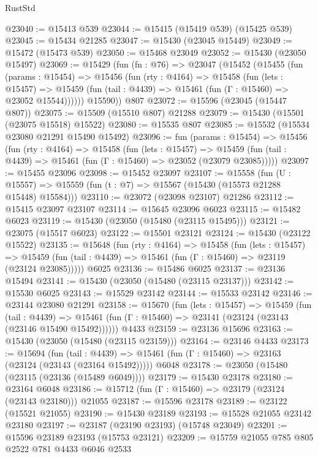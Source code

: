 \begin{lexlean}{RustStd}
\begin{coremodule}
@23040 := @15413 @539
@23044 := @15415 (@15419 @539) (@15425 @539)
@23045 := @15434 @21285
@23047 := @15430 (@23045 @15449)
@23049 := @15472 (@15473 @539)
@23050 := @15468 @23049
@23052 := @15430 (@23050 @15497)
@23069 := @15429
    (fun (fn : @76) =>
    @23047
      (@15452
        (@15455
          (fun (params : @15454) =>
          @15456
            (fun (rty : @4164) =>
            @15458
              (fun (lets : @15457) =>
              @15459 (fun (tail : @4439) => @15461 (fun (Γ : @15460) => @23052 @15544))))))
        @15590))
    @807
@23072 := @15596 (@23045 (@15447 @807))
@23075 := @15509 (@15510 @807) @21288
@23079 := @15430 (@15501 (@23075 @15518) @15522)
@23080 := @15535 @807
@23085 := @15532 (@15534 @23080 @21291 @15490 @15492)
@23096 := fun (params : @15454) =>
  @15456
    (fun (rty : @4164) =>
    @15458
      (fun (lets : @15457) =>
      @15459 (fun (tail : @4439) => @15461 (fun (Γ : @15460) => @23052 (@23079 @23085)))))
@23097 := @15455 @23096
@23098 := @15452 @23097
@23107 := @15558
    (fun (U : @15557) => @15559 (fun (t : @7) => @15567 (@15430 (@15573 @21288 @15448) @15584)))
@23110 := @23072 (@23098 @23107) @21286
@23112 := @15415 @23097 @23107
@23114 := @15645 @23096 @6023
@23115 := @15482 @6023
@23119 := @15430 (@23050 (@15480 (@23115 @15495)))
@23121 := @23075 (@15517 @6023)
@23122 := @15501 @23121
@23124 := @15430 (@23122 @15522)
@23135 := @15648
    (fun (rty : @4164) =>
    @15458
      (fun (lets : @15457) =>
      @15459 (fun (tail : @4439) => @15461 (fun (Γ : @15460) => @23119 (@23124 @23085)))))
    @6025
@23136 := @15486 @6025
@23137 := @23136 @15494
@23141 := @15430 (@23050 (@15480 (@23115 @23137)))
@23142 := @15530 @6025
@23143 := @15529 @23142
@23144 := @15533 @23142
@23146 := @23144 @23080 @21291
@23158 := @15670
    (fun (lets : @15457) =>
    @15459
      (fun (tail : @4439) =>
      @15461 (fun (Γ : @15460) => @23141 (@23124 (@23143 (@23146 @15490 @15492))))))
    @4433
@23159 := @23136 @15696
@23163 := @15430 (@23050 (@15480 (@23115 @23159)))
@23164 := @23146 @4433
@23173 := @15694
    (fun (tail : @4439) => @15461 (fun (Γ : @15460) => @23163 (@23124 (@23143 (@23164 @15492)))))
    @6048
@23178 := @23050 (@15480 (@23115 (@23136 (@15489 @6049))))
@23179 := @15430 @23178
@23180 := @23164 @6048
@23186 := @15712 (fun (Γ : @15460) => @23179 (@23124 (@23143 @23180))) @21055
@23187 := @15596 @23178
@23189 := @23122 (@15521 @21055)
@23190 := @15430 @23189
@23193 := @15528 @21055 @23142 @23180
@23197 := @23187 (@23190 @23193) (@15748 @23049)
@23201 := @15596 @23189 @23193 (@15753 @23121)
@23209 := @15759 @21055 @785 @805 @2522 @781 @4433 @6046 @2533

\end{coremodule}
\end{lexlean}
